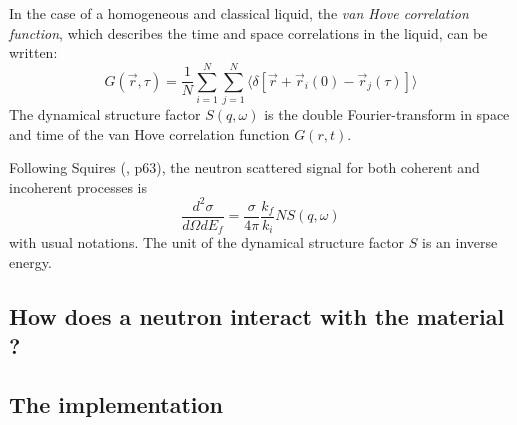In the case of a homogeneous and classical liquid, the {\it van Hove correlation function}, which describes the time and space correlations in the liquid, can be written:
\begin{equation} \label{eq:vanhove}
G(\vec{r},\tau) = \frac{1}{N} \sum_{i=1}^N \sum_{j=1}^N  \langle\delta[\vec{r} + \vec{r}_i(0) - \vec{r}_j(\tau)]\rangle
\end{equation}
The dynamical structure factor $S(q,\omega)$ is the double Fourier-transform in space and time of the van Hove correlation function $G(r,t)$.

Following Squires (\cite{squires}, p63), the neutron scattered signal for both coherent and incoherent processes is
\begin{equation}
\frac{d^2\sigma}{d\Omega dE_f} = \frac{\sigma}{4\pi}\frac{k_f}{k_i} N S(q, \omega)
\end{equation}
with usual notations. The unit of the dynamical structure factor $S$ is an inverse energy.

\subsection{How does a neutron interact with the material ?}

\subsection{The implementation}